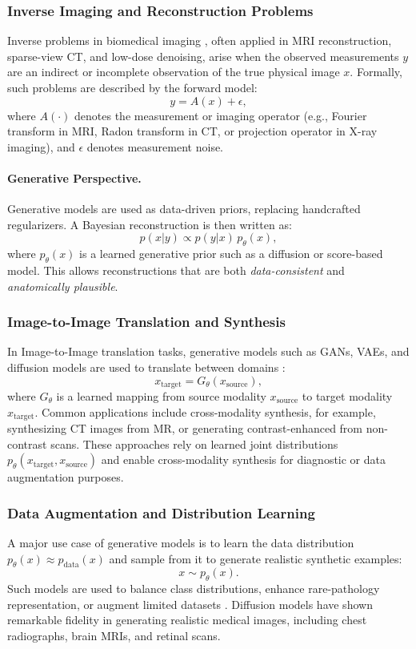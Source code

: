 \subsubsection{Inverse Imaging and Reconstruction Problems}
Inverse problems in biomedical imaging \citep{accelerated_mri_motion_correction_2023, score_based_diffusion_mri_2022, cao2022spiritdiffusion}, often applied in MRI reconstruction, sparse-view CT, and low-dose denoising, arise when the observed measurements \( y \) are an indirect or incomplete observation of the true physical image \( x \). 
Formally, such problems are described by the forward model:
\[
y = A(x) + \epsilon,
\]
where \( A(\cdot) \) denotes the measurement or imaging operator (e.g., Fourier transform in MRI, Radon transform in CT, 
or projection operator in X-ray imaging), and \( \epsilon \) denotes measurement noise.

\paragraph{Generative Perspective.}
Generative models are used as data-driven priors, replacing handcrafted regularizers. 
A Bayesian reconstruction is then written as:
\[
p(x|y) \propto p(y|x)\,p_\theta(x),
\]
where \( p_\theta(x) \) is a learned generative prior such as a diffusion or score-based model. 
This allows reconstructions that are both \emph{data-consistent} and \emph{anatomically plausible}. 

\subsubsection{Image-to-Image Translation and Synthesis}
In Image-to-Image translation tasks, generative models such as GANs, VAEs, and diffusion models are used to translate between domains \citep{Lyu2022ConversionBC, Meng2022ANU}:
\[
x_\text{target} = G_\theta(x_\text{source}),
\]
where \( G_\theta \) is a learned mapping from source modality \( x_\text{source} \) to target modality \( x_\text{target} \).
Common applications include cross-modality synthesis, for example, synthesizing CT images from MR, or generating contrast-enhanced from non-contrast scans. 
These approaches rely on learned joint distributions \( p_\theta(x_\text{target}, x_\text{source}) \) and enable 
cross-modality synthesis for diagnostic or data augmentation purposes.

\subsubsection{Data Augmentation and Distribution Learning}
A major use case of generative models is to learn the data distribution \( p_\theta(x) \approx p_\text{data}(x) \) 
and sample from it to generate realistic synthetic examples:
\[
x \sim p_\theta(x).
\]
Such models are used to balance class distributions, enhance rare-pathology representation, or augment limited datasets \citep{generative_ai_medical_imaging_2025}. 
Diffusion models have shown remarkable fidelity in generating realistic medical images, including chest radiographs, 
brain MRIs, and retinal scans.

